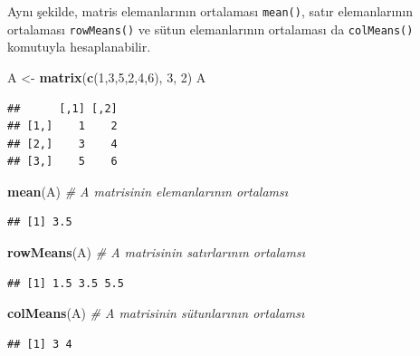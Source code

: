 \documentclass[
]{book}
\newenvironment{Shaded}{\begin{snugshade}}{\end{snugshade}}
\newcommand{\CommentTok}[1]{\textcolor[rgb]{0.56,0.35,0.01}{\textit{#1}}}
\newcommand{\DecValTok}[1]{\textcolor[rgb]{0.00,0.00,0.81}{#1}}
\newcommand{\FunctionTok}[1]{\textcolor[rgb]{0.13,0.29,0.53}{\textbf{#1}}}
\newcommand{\NormalTok}[1]{#1}
\newcommand{\OtherTok}[1]{\textcolor[rgb]{0.56,0.35,0.01}{#1}}
\begin{document}
Aynı şekilde, matris elemanlarının ortalaması \texttt{mean()}, satır elemanlarının ortalaması \texttt{rowMeans()} ve sütun elemanlarının ortalaması da \texttt{colMeans()} komutuyla hesaplanabilir.

\begin{Shaded}
\begin{Highlighting}[]
\NormalTok{ A }\OtherTok{\textless{}{-}} \FunctionTok{matrix}\NormalTok{(}\FunctionTok{c}\NormalTok{(}\DecValTok{1}\NormalTok{,}\DecValTok{3}\NormalTok{,}\DecValTok{5}\NormalTok{,}\DecValTok{2}\NormalTok{,}\DecValTok{4}\NormalTok{,}\DecValTok{6}\NormalTok{), }\DecValTok{3}\NormalTok{, }\DecValTok{2}\NormalTok{) }
\NormalTok{ A }
\end{Highlighting}
\end{Shaded}

\begin{verbatim}
##      [,1] [,2]
## [1,]    1    2
## [2,]    3    4
## [3,]    5    6
\end{verbatim}

\begin{Shaded}
\begin{Highlighting}[]
 \FunctionTok{mean}\NormalTok{(A)        }\CommentTok{\# A matrisinin elemanlarının ortalamsı}
\end{Highlighting}
\end{Shaded}

\begin{verbatim}
## [1] 3.5
\end{verbatim}

\begin{Shaded}
\begin{Highlighting}[]
 \FunctionTok{rowMeans}\NormalTok{(A)    }\CommentTok{\# A matrisinin satırlarının ortalamsı}
\end{Highlighting}
\end{Shaded}

\begin{verbatim}
## [1] 1.5 3.5 5.5
\end{verbatim}

\begin{Shaded}
\begin{Highlighting}[]
 \FunctionTok{colMeans}\NormalTok{(A)    }\CommentTok{\# A matrisinin sütunlarının ortalamsı}
\end{Highlighting}
\end{Shaded}

\begin{verbatim}
## [1] 3 4
\end{verbatim}
\end{document}
